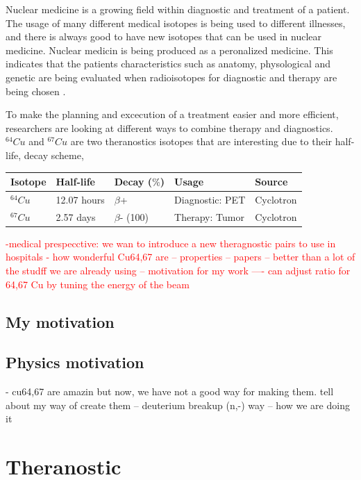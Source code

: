 \documentclass[twoside,english]{uiofysmaster/uiofysmaster}
\begin{document}
Nuclear medicine is a growing field within diagnostic and treatment of a patient. The usage of many different medical isotopes is being used to different illnesses, and there is always good to have new isotopes that can be used in nuclear medicine.
Nuclear medicin is being produced as a peronalized medicine. This indicates that the patients characteristics such as anatomy, physological and genetic are being evaluated when radioisotopes for diagnostic and therapy are being chosen \cite{Ahmedova2018}. 


To make the planning and excecution of a treatment easier and more efficient, researchers are looking at different ways to combine therapy and diagnostics. 
$^{64}Cu$ and $^{67}Cu$ are two theranostics isotopes that are interesting due to their half-life, decay scheme, 


 \begin{tabular}{  p{3cm} p{3cm} p{3cm} p{3cm} p{3cm}   }
 \hline
Isotope  & Half-life & Decay ($\%$) & Usage & Source \\
 \hline
 $^{64}Cu$ &  12.07 hours & $\beta$+ & Diagnostic: PET & Cyclotron \\
 $^{67}Cu$ &  2.57 days & $\beta$- (100) & Therapy: Tumor & Cyclotron\\ 
 \hline
\end{tabular}


\textcolor{red}{-medical prespecctive: we wan to introduce a new theragnostic pairs to use in hospitals
- how wonderful Cu64,67 are
-- properties
-- papers
-- better than a lot of the studff we are already using
-- motivation for my work
---- can adjust ratio for 64,67 Cu by tuning the energy of the beam}



\subsection{My motivation}
\label{sec: my_motivation}




\subsection{Physics motivation}
\label{sec: physics_motivation}

- cu64,67 are amazin but now, we have not a good way for making them. tell about my way of create them
-- deuterium breakup (n,-) way
-- how we are doing it


\section{Theranostic}
\label{sec:theranostic}
\end{document}
